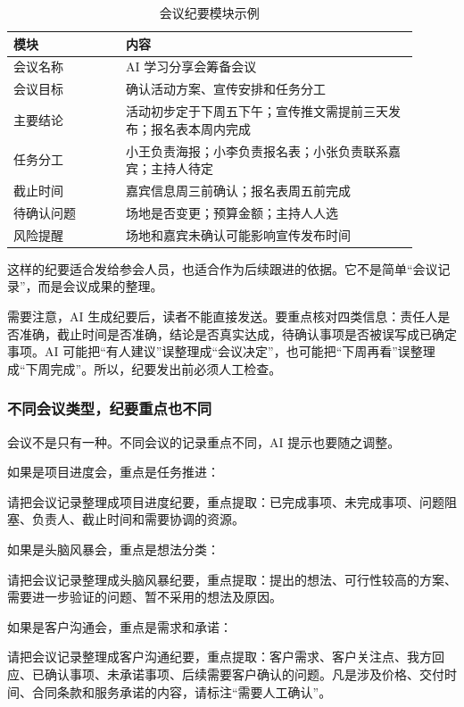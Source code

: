 \begin{table}[H]
\centering
\caption{会议纪要模块示例}
\label{tab:meeting-minutes-module-example}
\begin{tabular}{p{0.25\linewidth} p{0.65\linewidth}}
\toprule
\textbf{模块} & \textbf{内容} \\
\midrule
会议名称 & AI 学习分享会筹备会议 \\
会议目标 & 确认活动方案、宣传安排和任务分工 \\
主要结论 & 活动初步定于下周五下午；宣传推文需提前三天发布；报名表本周内完成 \\
任务分工 & 小王负责海报；小李负责报名表；小张负责联系嘉宾；主持人待定 \\
截止时间 & 嘉宾信息周三前确认；报名表周五前完成 \\
待确认问题 & 场地是否变更；预算金额；主持人人选 \\
风险提醒 & 场地和嘉宾未确认可能影响宣传发布时间 \\
\bottomrule
\end{tabular}
\end{table}

这样的纪要适合发给参会人员，也适合作为后续跟进的依据。它不是简单“会议记录”，而是会议成果的整理。

需要注意，AI 生成纪要后，读者不能直接发送。要重点核对四类信息：责任人是否准确，截止时间是否准确，结论是否真实达成，待确认事项是否被误写成已确定事项。AI 可能把“有人建议”误整理成“会议决定”，也可能把“下周再看”误整理成“下周完成”。所以，纪要发出前必须人工检查。

\subsubsection*{不同会议类型，纪要重点也不同}

会议不是只有一种。不同会议的记录重点不同，AI 提示也要随之调整。

如果是项目进度会，重点是任务推进：
\begin{tcolorbox}[promptbox]
请把会议记录整理成项目进度纪要，重点提取：已完成事项、未完成事项、问题阻塞、负责人、截止时间和需要协调的资源。
\end{tcolorbox}

如果是头脑风暴会，重点是想法分类：
\begin{tcolorbox}[promptbox]
请把会议记录整理成头脑风暴纪要，重点提取：提出的想法、可行性较高的方案、需要进一步验证的问题、暂不采用的想法及原因。
\end{tcolorbox}

如果是客户沟通会，重点是需求和承诺：
\begin{tcolorbox}[promptbox]
请把会议记录整理成客户沟通纪要，重点提取：客户需求、客户关注点、我方回应、已确认事项、未承诺事项、后续需要客户确认的问题。凡是涉及价格、交付时间、合同条款和服务承诺的内容，请标注“需要人工确认”。
\end{tcolorbox}

